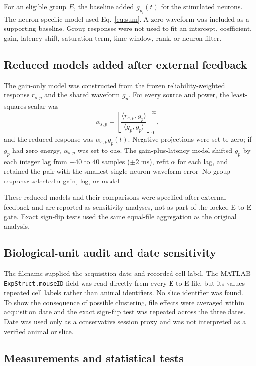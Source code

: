 \documentclass[10pt,twocolumn]{article}
\begin{document}
For an eligible group $E$, the baseline added $g_{p_s}(t)$ for the stimulated
neurons. The neuron-specific model used Eq.~\ref{eq:sum}. A zero waveform was
included as a supporting baseline. Group responses were not used to fit an
intercept, coefficient, gain, latency shift, saturation term, time window,
rank, or neuron filter.

\subsection{Reduced models added after external feedback}

The gain-only model was constructed from the frozen reliability-weighted
response $r_{s,p}$ and the shared waveform $g_p$. For every source and power,
the least-squares scalar was
\begin{equation}
\alpha_{s,p}=\left[
\frac{\langle r_{s,p},g_p\rangle}
{\langle g_p,g_p\rangle}\right]_{0}^{\infty},
\end{equation}
and the reduced response was $\alpha_{s,p}g_p(t)$. Negative projections were
set to zero; if $g_p$ had zero energy, $\alpha_{s,p}$ was set to one. The
gain-plus-latency model shifted $g_p$ by
each integer lag from $-40$ to $40$ samples ($\pm2$ ms), refit $\alpha$ for
each lag, and retained the pair with the smallest single-neuron waveform
error. No group response selected a gain, lag, or model.

These reduced models and their comparisons were specified after external
feedback and are reported as sensitivity analyses, not as part of the locked
E-to-E gate. Exact sign-flip tests used the same equal-file aggregation as
the original analysis.

\subsection{Biological-unit audit and date sensitivity}

The filename supplied the acquisition date and recorded-cell label. The
MATLAB \texttt{ExpStruct.mouseID} field was read directly from every E-to-E
file, but its values repeated cell labels rather than animal identifiers. No
slice identifier was found. To show the consequence of possible clustering,
file effects were averaged within acquisition date and the exact sign-flip
test was repeated across the three dates. Date was used only as a conservative
session proxy and was not interpreted as a verified animal or slice.

\subsection{Measurements and statistical tests}
\end{document}
